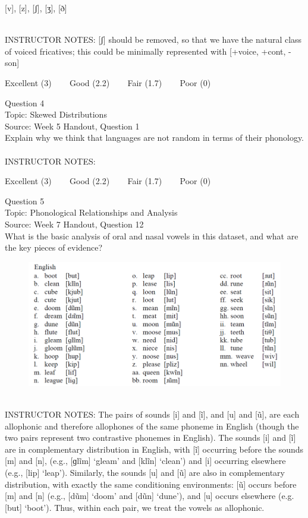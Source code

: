 \documentclass[12pt]{article}
\begin{document}
{[v]}, {[z]}, {[ʃ]}, {[ʒ]}, {[ð]}


~\\
INSTRUCTOR NOTES: [ʃ] should be removed, so that we have the natural class of voiced fricatives; this could be minimally represented with [+voice, +cont, -son]


\vfill
Excellent (3) ~~~ Good (2.2) ~~~ Fair (1.7) ~~~ Poor (0)
\newpage

{\large Question 4}\\

Topic: Skewed Distributions\\
Source: Week 5 Handout, Question 1\\

Explain why we think that languages are not random in terms of their phonology.\\


~\\
INSTRUCTOR NOTES: 


\vfill
Excellent (3) ~~~ Good (2.2) ~~~ Fair (1.7) ~~~ Poor (0)
\newpage

{\large Question 5}\\

Topic: Phonological Relationships and Analysis\\
Source: Week 7 Handout, Question 12\\

What is the basic analysis of oral and nasal vowels in this dataset, and what are the key pieces of evidence?\\

\begin{figure}[H]
\includegraphics{../images/english12.png}
\end{figure}

~\\
INSTRUCTOR NOTES: The pairs of sounds [i] and [ĩ], and [u] and [ũ], are each allophonic and therefore allophones of the same phoneme in English (though the two pairs represent two contrastive phonemes in English). The sounds [i] and [ĩ] are in complementary distribution in English, with [ĩ] occurring before the sounds [m] and [n], (e.g., [ɡlĩm] ‘gleam’ and [klĩn] ‘clean’) and [i] occurring elsewhere (e.g., [lip] ‘leap’). Similarly, the sounds [u] and [ũ] are also in complementary distribution, with exactly the same conditioning environments: [ũ] occurs before [m] and [n] (e.g., [dũm] ‘doom’ and [dũn] ‘dune’), and [u] occurs elsewhere (e.g. [but] ‘boot’). Thus, within each pair, we treat the vowels as allophonic. 
\end{document}
